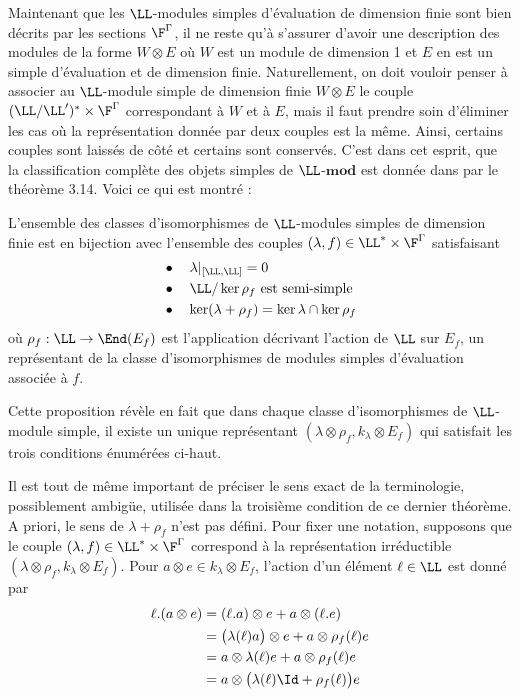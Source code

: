 Maintenant que les $\LL$-modules simples d'évaluation de dimension finie sont bien décrits par les sections $\F^\Gamma$, il ne reste qu'à s'assurer d'avoir une description des modules de la forme $W \otimes E$ où $W$ est un module de dimension 1 et $E$ en est un simple d'évaluation et de dimension finie. Naturellement, on doit vouloir penser à associer au $\LL$-module simple de dimension finie $W \otimes E$ le couple $(\LL/\LL')^* \times \F^\Gamma$ correspondant à $W$ et à $E$, mais il faut prendre soin d'éliminer les cas où la représentation donnée par deux couples est la même. Ainsi, certains couples sont laissés de côté et certains sont conservés. C'est dans cet esprit, que la classification complète des objets simples de $\LL$-$\mathbf{mod}$ est donnée dans \cite{LauTCA} par le théorème 3.14. Voici ce qui est montré :

\begin{Thm} \label{classmodules} L'ensemble des classes d'isomorphismes de $\LL$-modules simples de dimension finie est en bijection avec l'ensemble des couples $(\lambda,f) \in \LL^* \times \F^\Gamma$ satisfaisant
\begin{align*}
&\bullet \quad \lambda|_{[\LL,\LL]} = 0\\
&\bullet \quad \LL/\ker \rho_f \text{ est semi-simple}\\
&\bullet \quad \ker (\lambda+\rho_f) = \ker \lambda \cap \ker \rho_f
\end{align*}
où $\rho_f : \LL \rightarrow \End(E_f)$ est l'application décrivant l'action de $\LL$ sur $E_f$, un représentant de la classe d'isomorphismes de modules simples d'évaluation associée à $f$.
\end{Thm}

\begin{Rem} Cette proposition révèle en fait que dans chaque classe d'isomorphismes de $\LL$-module simple, il existe un unique représentant $(\lambda \otimes \rho_f, k_\lambda \otimes E_f)$ qui satisfait les trois conditions énumérées ci-haut.
\end{Rem}

Il est tout de même important de préciser le sens exact de la terminologie, possiblement ambigüe, utilisée dans la troisième condition de ce dernier théorème. A priori, le sens de $\lambda + \rho_f$ n'est pas défini. Pour fixer une notation, supposons que le couple $(\lambda,f) \in \LL^* \times \F^\Gamma$ correspond à la représentation irréductible $(\lambda \otimes \rho_f, k_\lambda \otimes E_f)$. Pour $a \otimes e \in k_\lambda \otimes E_f$, l'action d'un élément $\ell \in \LL$ est donné par
\begin{align*}
\ell.(a \otimes e) &= (\ell.a) \otimes e + a \otimes (\ell.e)\\
&= \big(\lambda(\ell)a\big) \otimes e + a \otimes \rho_f(\ell)e\\
&= a \otimes \lambda(\ell)e + a \otimes \rho_f(\ell)e\\
&= a \otimes \big(\lambda(\ell)\Id+\rho_f(\ell)\big)e
\end{align*}

